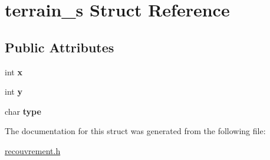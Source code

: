\hypertarget{structterrain__s}{}\section{terrain\+\_\+s Struct Reference}
\label{structterrain__s}
\subsection*{Public Attributes}
\begin{DoxyCompactItemize}
\item 
int {\bfseries x}\hypertarget{structterrain__s_a0f7509a0f36d92475bc2b50639573e5a}{}\label{structterrain__s_a0f7509a0f36d92475bc2b50639573e5a}

\item 
int {\bfseries y}\hypertarget{structterrain__s_a2c2b67de9dcfe30c5a0c432be996b5fb}{}\label{structterrain__s_a2c2b67de9dcfe30c5a0c432be996b5fb}

\item 
char {\bfseries type}\hypertarget{structterrain__s_acf000f7ca540891f7bfa8fb16f33a115}{}\label{structterrain__s_acf000f7ca540891f7bfa8fb16f33a115}

\end{DoxyCompactItemize}


The documentation for this struct was generated from the following file\+:\begin{DoxyCompactItemize}
\item 
\hyperlink{recouvrement_8h}{recouvrement.\+h}\end{DoxyCompactItemize}
